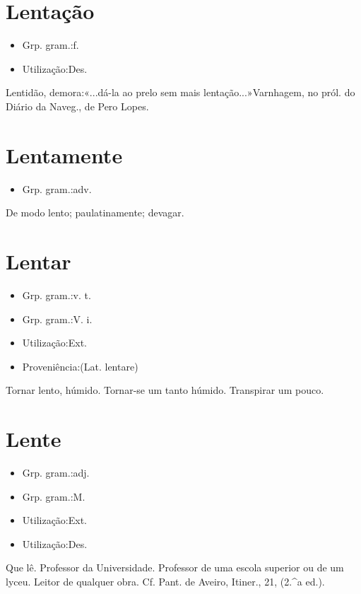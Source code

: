 \section{Lentação}
\begin{itemize}
\item {Grp. gram.:f.}
\end{itemize}
\begin{itemize}
\item {Utilização:Des.}
\end{itemize}
Lentidão, demora:«\textunderscore ...dá-la ao prelo sem mais lentação...\textunderscore »Varnhagem, no pról. do \textunderscore Diário da Naveg.\textunderscore , de Pero Lopes.
\section{Lentamente}
\begin{itemize}
\item {Grp. gram.:adv.}
\end{itemize}
De modo lento; paulatinamente; devagar.
\section{Lentar}
\begin{itemize}
\item {Grp. gram.:v. t.}
\end{itemize}
\begin{itemize}
\item {Grp. gram.:V. i.}
\end{itemize}
\begin{itemize}
\item {Utilização:Ext.}
\end{itemize}
\begin{itemize}
\item {Proveniência:(Lat. \textunderscore lentare\textunderscore )}
\end{itemize}
Tornar lento, húmido.
Tornar-se um tanto húmido.
Transpirar um pouco.
\section{Lente}
\begin{itemize}
\item {Grp. gram.:adj.}
\end{itemize}
\begin{itemize}
\item {Grp. gram.:M.}
\end{itemize}
\begin{itemize}
\item {Utilização:Ext.}
\end{itemize}
\begin{itemize}
\item {Utilização:Des.}
\end{itemize}
Que lê.
Professor da Universidade.
Professor de uma escola superior ou de um lyceu.
Leitor de qualquer obra. Cf. Pant. de Aveiro, \textunderscore Itiner.\textunderscore , 21, (2.^a ed.).
